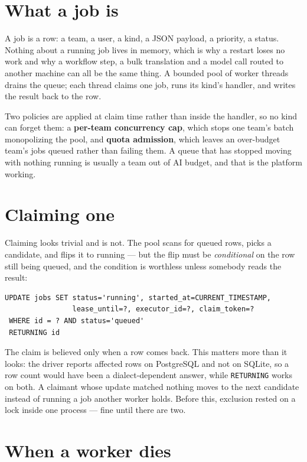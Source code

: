 \documentclass[11pt,a4paper]{report}
\begin{document}
\section{What a job is}

A job is a row: a team, a user, a kind, a JSON payload, a priority, a status. Nothing about a running job lives in memory, which is why a restart loses no work and why a workflow step, a bulk translation and a model call routed to another machine can all be the same thing. A bounded pool of worker threads drains the queue; each thread claims one job, runs its kind's handler, and writes the result back to the row.

Two policies are applied at claim time rather than inside the handler, so no kind can forget them: a \textbf{per-team concurrency cap}, which stops one team's batch monopolizing the pool, and \textbf{quota admission}, which leaves an over-budget team's jobs queued rather than failing them. A queue that has stopped moving with nothing running is usually a team out of AI budget, and that is the platform working.

\section{Claiming one}

Claiming looks trivial and is not. The pool scans for queued rows, picks a candidate, and flips it to running --- but the flip must be \emph{conditional} on the row still being queued, and the condition is worthless unless somebody reads the result:

\begin{lstlisting}
UPDATE jobs SET status='running', started_at=CURRENT_TIMESTAMP,
                lease_until=?, executor_id=?, claim_token=?
 WHERE id = ? AND status='queued'
 RETURNING id
\end{lstlisting}

The claim is believed only when a row comes back. This matters more than it looks: the driver reports affected rows on PostgreSQL and not on SQLite, so a row count would have been a dialect-dependent answer, while \texttt{RETURNING} works on both. A claimant whose update matched nothing moves to the next candidate instead of running a job another worker holds. Before this, exclusion rested on a lock inside one process --- fine until there are two.

\section{When a worker dies}
\end{document}

